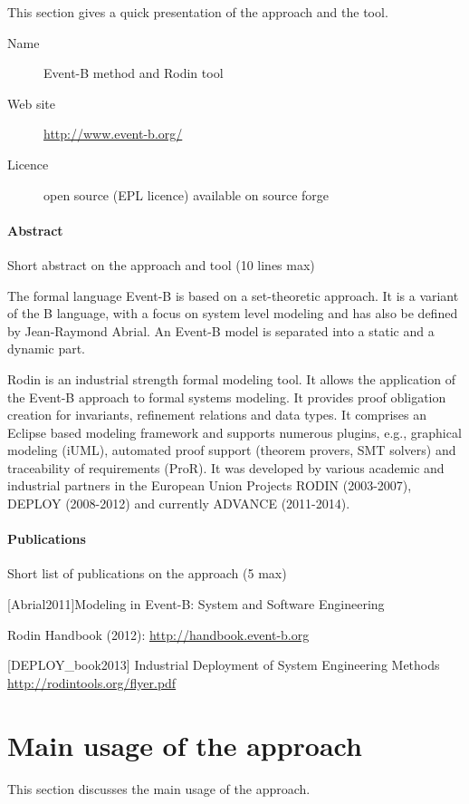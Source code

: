 This section gives a quick presentation of the approach and the tool.

\begin{description}
\item[Name] Event-B method and Rodin tool
\item[Web site] \url{http://www.event-b.org/}
\item[Licence] open source (EPL licence)  available on source forge
\end{description}

\paragraph{Abstract} Short abstract on the approach and tool (10 lines max)

The formal language Event-B is based on a set-theoretic approach. It is a variant of the B
language, with a focus on system level modeling and has also be defined by  Jean-Raymond Abrial. An Event-B model is separated into a static
and a dynamic part.

Rodin is an industrial strength formal modeling tool. It allows the application of the Event-B approach to formal systems modeling. It provides proof obligation creation for invariants, refinement relations and data types. It comprises an Eclipse based modeling framework and supports numerous plugins, e.g., graphical modeling (iUML), automated proof support (theorem provers, SMT solvers) and traceability of requirements (ProR). It was developed by various academic and industrial partners in the European Union Projects RODIN (2003-2007), DEPLOY (2008-2012) and currently ADVANCE (2011-2014).

\paragraph{Publications} Short list of publications on the approach (5 max)

[Abrial2011]Modeling in Event-B: System and Software Engineering

Rodin Handbook (2012): \url{http://handbook.event-b.org}

[DEPLOY\_book2013] Industrial Deployment of System Engineering Methods \url{http://rodintools.org/flyer.pdf}


\section{Main usage of the approach}
\label{main_usage}
This section discusses the main usage of the approach.

